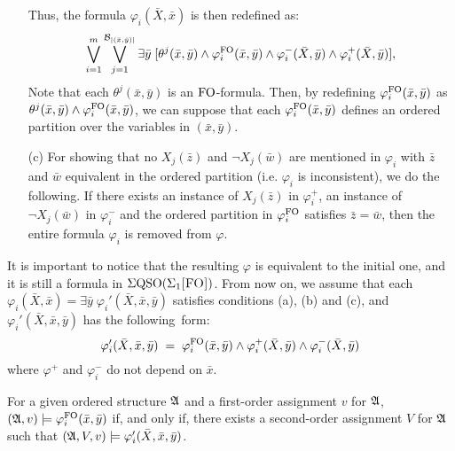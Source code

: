 \begin{itemize}
	Thus, the formula $\varphi_i(\bar{X},\bar{x})$ is then redefined as:
	$$
	\bigvee_{i = 1}^m \bigvee_{j = 1}^{\mathcal{B}_{\vert (\bar{x},\bar{y}) \vert}} \exists \bar{y} \; [\theta^j(\bar{x},\bar{y})\wedge \varphi_i^{{\rm FO}}(\bar{x},\bar{y}) \wedge \varphi_i^{-}(\bar{X},\bar{y}) \wedge \varphi_i^{+}(\bar{X},\bar{y})],
	$$
	Note that each $\theta^j(\bar{x},\bar{y})$ is an ${\rm FO}$-formula.
	Then, by redefining $\varphi_i^{{\rm FO}}(\bar{x},\bar{y})$  as $\theta^j(\bar{x},\bar{y})\wedge \varphi_i^{{\rm FO}}(\bar{x},\bar{y})$, we can suppose that each $\varphi_i^{{\rm FO}}(\bar{x},\bar{y})$ defines an ordered partition over the variables in $(\bar{x},\bar{y})$.
	\item[(c)] For showing that no $X_j(\bar{z})$ and $\neg X_j(\bar{w})$ are mentioned in $\varphi_i$ with $\bar{z}$ and $\bar{w}$ equivalent in the ordered partition (i.e. $\varphi_i$ is inconsistent), we do the following. If there exists an instance of $X_j(\bar{z})$ in $\varphi^{+}_i$, an instance of $\neg X_j(\bar{w})$ in $\varphi^{-}_i$ and the ordered partition in $\varphi^{{\rm FO}}_i$ satisfies $\bar{z} = \bar{w}$, then the entire formula $\varphi_i$ is removed from $\varphi$.
\end{itemize}
It is important to notice that the resulting $\varphi$ is equivalent to the initial one, and it is still a formula in $\Sigma{\rm QSO}(\Sigma_{1}\textsc{[FO]})$. From now on, we assume that each $\varphi_i(\bar{X},\bar{x}) = \exists \bar{y} \;  \varphi_i'(\bar{X},\bar{x}, \bar{y}) $ satisfies conditions (a), (b) and (c), and $\varphi_i'(\bar{X},\bar{x}, \bar{y})$ has the following~form:
$$
\varphi_i'(\bar{X},\bar{x}, \bar{y}) \; = \; \varphi^{{\rm FO}}_i(\bar{x},\bar{y}) \wedge \varphi^{+}_i(\bar{X}, \bar{y}) \wedge \varphi^{-}_i(\bar{X},\bar{y}) 
$$
where $\varphi^{+}$ and $\varphi^{-}_i$ do not depend on  $\bar{x}$.
\begin{claim}\label{claim:minusone}
	For a given ordered structure $\mathfrak{A}$ and a first-order assignment $v$ for $\mathfrak{A}$, $(\mathfrak{A},v)\models\varphi^{{\rm FO}}_i(\bar{x},\bar{y})$ if, and only if, there exists a second-order assignment $V$ for $\mathfrak{A}$ such that $(\mathfrak{A},V,v)\models \varphi_i'(\bar{X},\bar{x}, \bar{y})$.
\end{claim}
